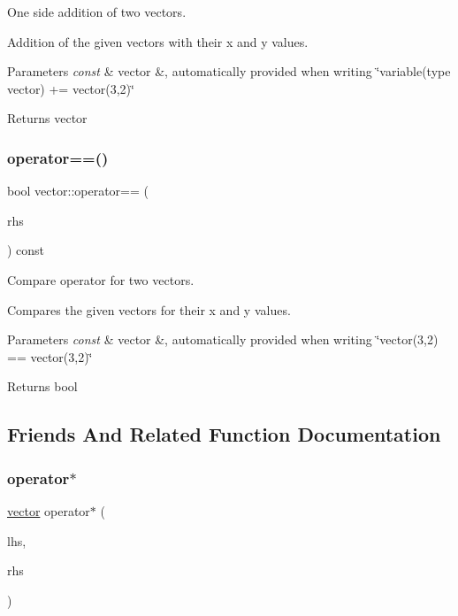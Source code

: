 One side addition of two vectors. 

Addition of the given vectors with their x and y values. 
\begin{DoxyParams}{Parameters}
{\em const} & vector \&, automatically provided when writing \char`\"{}variable(type vector) += vector(3,2)\char`\"{} \\
\hline
\end{DoxyParams}
\begin{DoxyReturn}{Returns}
vector 
\end{DoxyReturn}
\mbox{\label{classvector_a14470a2d43b26c15f0f7aaeeb6ae4f04}} 
\subsubsection{\texorpdfstring{operator==()}{operator==()}}
{\footnotesize\ttfamily bool vector\+::operator== (\begin{DoxyParamCaption}\item[{const \hyperlink{classvector}{vector} \&}]{rhs }\end{DoxyParamCaption}) const}



Compare operator for two vectors. 

Compares the given vectors for their x and y values. 
\begin{DoxyParams}{Parameters}
{\em const} & vector \&, automatically provided when writing \char`\"{}vector(3,2) == vector(3,2)\char`\"{} \\
\hline
\end{DoxyParams}
\begin{DoxyReturn}{Returns}
bool 
\end{DoxyReturn}


\subsection{Friends And Related Function Documentation}
\mbox{\label{classvector_af3f0754484a0db96cf49a62c1da7b9e0}} 
\subsubsection{\texorpdfstring{operator$\ast$}{operator*}}
{\footnotesize\ttfamily \hyperlink{classvector}{vector} operator$\ast$ (\begin{DoxyParamCaption}\item[{const int}]{lhs,  }\item[{const \hyperlink{classvector}{vector} \&}]{rhs }\end{DoxyParamCaption})\hspace{0.3cm}{\ttfamily [friend]}}



